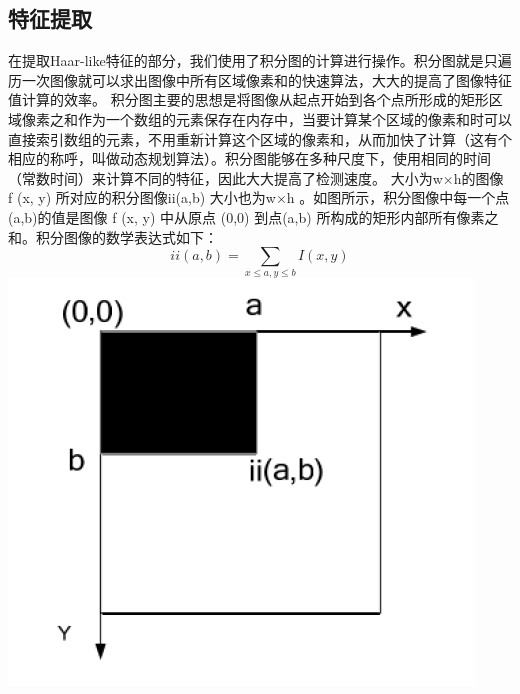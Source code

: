 \documentclass{article}
\begin{document}
\subsection{特征提取}
在提取Haar-like特征的部分，我们使用了积分图的计算进行操作。积分图就是只遍历一次图像就可以求出图像中所有区域像素和的快速算法，大大的提高了图像特征值计算的效率。
\newline\newline
积分图主要的思想是将图像从起点开始到各个点所形成的矩形区域像素之和作为一个数组的元素保存在内存中，当要计算某个区域的像素和时可以直接索引数组的元素，不用重新计算这个区域的像素和，从而加快了计算（这有个相应的称呼，叫做动态规划算法）。积分图能够在多种尺度下，使用相同的时间（常数时间）来计算不同的特征，因此大大提高了检测速度。
\newline\newline
大小为w×h的图像 f (x, y) 所对应的积分图像ii(a,b) 大小也为w×h 。如图所示，积分图像中每一个点 (a,b)的值是图像 f (x, y) 中从原点 (0,0) 到点(a,b) 所构成的矩形内部所有像素之和。积分图像的数学表达式如下：$$i i(a, b)=\sum_{x \leq a, y \leq b} I(x, y)$$
\newline
\includegraphics[scale=0.4]{ig.png}
\end{document}
